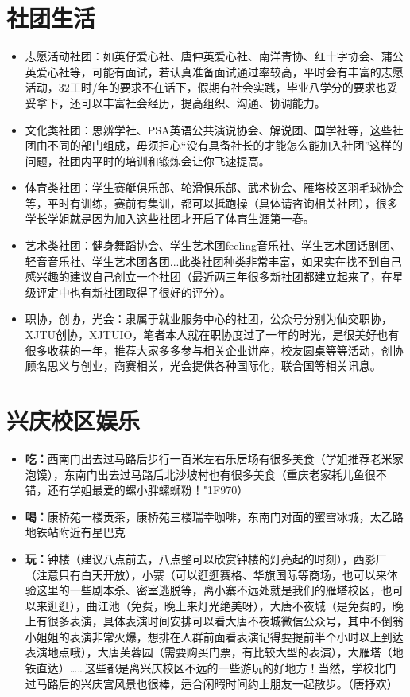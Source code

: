 \documentclass[zihao=-4,fontset=none]{Beautybook-CN}
\begin{document}
\section{社团生活}
\begin{itemize}
\item 志愿活动社团：如英仔爱心社、唐仲英爱心社、南洋青协、红十字协会、蒲公英爱心社等，可能有面试，若认真准备面试通过率较高，平时会有丰富的志愿活动，32工时/年的要求不在话下，假期有社会实践，毕业八学分的要求也妥妥拿下，还可以丰富社会经历，提高组织、沟通、协调能力。
\item 文化类社团：思辨学社、PSA英语公共演说协会、解说团、国学社等，这些社团由不同的部门组成，毋须担心“没有具备社长的才能怎么能加入社团”这样的问题，社团内平时的培训和锻炼会让你飞速提高。
\item 体育类社团：学生赛艇俱乐部、轮滑俱乐部、武术协会、雁塔校区羽毛球协会等，平时有训练，赛前有集训，都可以抵跑操（具体请咨询相关社团），很多学长学姐就是因为加入这些社团才开启了体育生涯第一春。
\item 艺术类社团：健身舞蹈协会、学生艺术团feeling音乐社、学生艺术团话剧团、轻音音乐社、学生艺术团各团...此类社团种类非常丰富，如果实在找不到自己感兴趣的建议自己创立一个社团（最近两三年很多新社团都建立起来了，在星级评定中也有新社团取得了很好的评分）。
\item 职协，创协，光会：隶属于就业服务中心的社团，公众号分别为仙交职协，XJTU创协，XJTUIO，笔者本人就在职协度过了一年的时光，是很美好也有很多收获的一年，推荐大家多多参与相关企业讲座，校友圆桌等等活动，创协顾名思义与创业，商赛相关，光会提供各种国际化，联合国等相关讯息。
\end{itemize}
\section{兴庆校区娱乐}
\begin{itemize}
\item \textbf{吃：}西南门出去过马路后步行一百米左右乐居场有很多美食（学姐推荐老米家泡馍），东南门出去过马路后北沙坡村也有很多美食（重庆老家耗儿鱼很不错，还有学姐最爱的螺小胖螺蛳粉！{\char"1F970}）
\item \textbf{喝：}康桥苑一楼贡茶，康桥苑三楼瑞幸咖啡，东南门对面的蜜雪冰城，太乙路地铁站附近有星巴克
\item \textbf{玩：}钟楼（建议八点前去，八点整可以欣赏钟楼的灯亮起的时刻），西影厂（注意只有白天开放），小寨（可以逛逛赛格、华旗国际等商场，也可以来体验这里的一些剧本杀、密室逃脱等，离小寨不远处就是我们的雁塔校区，也可以来逛逛），曲江池（免费，晚上来灯光绝美呀），大唐不夜城（是免费的，晚上有很多表演，具体表演时间安排可以看大唐不夜城微信公众号，其中不倒翁小姐姐的表演非常火爆，想排在人群前面看表演记得要提前半个小时以上到达表演地点哦），大唐芙蓉园（需要购买门票，有比较大型的表演），大雁塔（地铁直达）{\ldots}{\ldots}这些都是离兴庆校区不远的一些游玩的好地方！当然，学校北门过马路后的兴庆宫风景也很棒，适合闲暇时间约上朋友一起散步。（唐抒欢）
\end{itemize}
\end{document}
